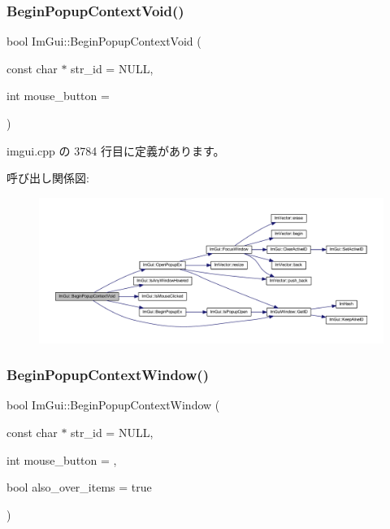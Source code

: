 \subsubsection{\texorpdfstring{Begin\+Popup\+Context\+Void()}{BeginPopupContextVoid()}}
{\footnotesize\ttfamily bool Im\+Gui\+::\+Begin\+Popup\+Context\+Void (\begin{DoxyParamCaption}\item[{const char $\ast$}]{str\+\_\+id = {\ttfamily NULL},  }\item[{int}]{mouse\+\_\+button = {} }\end{DoxyParamCaption})}



 imgui.\+cpp の 3784 行目に定義があります。

呼び出し関係図\+:\nopagebreak
\begin{figure}[H]
\begin{center}
\leavevmode
\includegraphics[width=350pt]{namespace_im_gui_a87a2228929503fff067d2e167a690751_cgraph}
\end{center}
\end{figure}
\mbox{\label{namespace_im_gui_acf98c99f041ea341d0328e071c56411b}} 
\subsubsection{\texorpdfstring{Begin\+Popup\+Context\+Window()}{BeginPopupContextWindow()}}
{\footnotesize\ttfamily bool Im\+Gui\+::\+Begin\+Popup\+Context\+Window (\begin{DoxyParamCaption}\item[{const char $\ast$}]{str\+\_\+id = {\ttfamily NULL},  }\item[{int}]{mouse\+\_\+button = {},  }\item[{bool}]{also\+\_\+over\+\_\+items = {\ttfamily true} }\end{DoxyParamCaption})}



